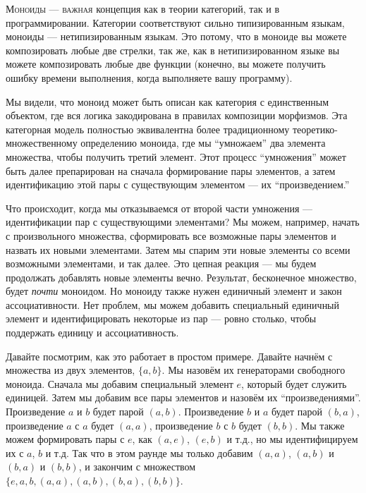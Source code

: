 
\lettrine[lhang=0.17]{М}{оноиды --- важная} концепция как в теории категорий,
так и в программировании. Категории соответствуют сильно типизированным языкам,
моноиды --- нетипизированным языкам. Это потому, что в моноиде вы можете композировать любые
две стрелки, так же, как в нетипизированном языке вы можете композировать любые две функции
(конечно, вы можете получить ошибку времени выполнения, когда выполняете вашу
программу).

Мы видели, что моноид может быть описан как категория с единственным
объектом, где вся логика закодирована в правилах композиции морфизмов.
Эта категорная модель полностью эквивалентна более традиционному
теоретико-множественному определению моноида, где мы ``умножаем'' два
элемента множества, чтобы получить третий элемент. Этот процесс
``умножения'' может быть далее препарирован на сначала формирование пары
элементов, а затем идентификацию этой пары с существующим элементом ---
их ``произведением.''

Что происходит, когда мы отказываемся от второй части умножения ---
идентификации пар с существующими элементами? Мы можем, например,
начать с произвольного множества, сформировать все возможные пары элементов и
назвать их новыми элементами. Затем мы спарим эти новые элементы со всеми
возможными элементами, и так далее. Это цепная реакция --- мы будем продолжать
добавлять новые элементы вечно. Результат, бесконечное множество, будет
\emph{почти} моноидом. Но моноиду также нужен единичный элемент и
закон ассоциативности. Нет проблем, мы можем добавить специальный единичный элемент и
идентифицировать некоторые из пар --- ровно столько, чтобы поддержать единицу и
ассоциативность.

Давайте посмотрим, как это работает в простом примере. Давайте начнём с множества из
двух элементов, $\{a, b\}$. Мы назовём их генераторами
свободного моноида. Сначала мы добавим специальный элемент $e$, который будет служить
единицей. Затем мы добавим все пары элементов и назовём их
``произведениями''. Произведение $a$ и $b$ будет парой
$(a, b)$. Произведение $b$ и $a$ будет парой
$(b, a)$, произведение $a$ с $a$ будет
$(a, a)$, произведение $b$ с $b$ будет
$(b, b)$. Мы также можем формировать пары с $e$, как
$(a, e)$, $(e, b)$ и т.д., но мы идентифицируем их с
$a$, $b$ и т.д. Так что в этом раунде мы только добавим
$(a, a)$, $(a, b)$ и $(b, a)$ и
$(b, b)$, и закончим с множеством
$\{e, a, b, (a, a), (a, b), (b, a), (b, b)\}$.

